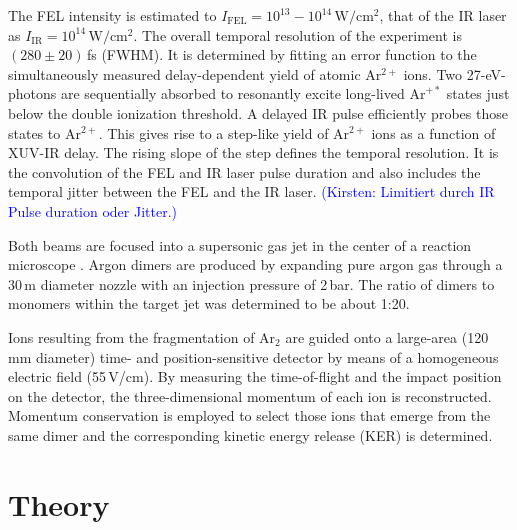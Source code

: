 \documentclass[%
 aip,
rsi,%
 amsmath,amssymb,
preprint,%
]{revtex4-1}
\begin{document}
The FEL intensity is estimated to $I_{\mathrm{FEL}} = 10^{13}-10^{14}\,\mathrm{W}/\mathrm{cm}^2$, that of the IR laser as $I_{\mathrm{IR}} = 10^{14}\,\mathrm{W}/\mathrm{cm}^2$. The overall temporal resolution of the experiment is $(280 \pm 20)$\,fs (FWHM). It is determined by fitting an error function to the simultaneously measured delay-dependent yield of atomic Ar$^{2+}$ ions. Two 27-eV-photons are sequentially absorbed to resonantly excite long-lived $\mathrm{Ar}^{+*}$ states just below the double ionization threshold. A delayed IR pulse efficiently probes those states to Ar$^{2+}$. This gives rise to a step-like yield of Ar$^{2+}$ ions as a function of XUV-IR delay. The rising slope of the step defines the temporal resolution. It is the convolution of the FEL and IR laser pulse duration and also includes the temporal jitter between the FEL and the IR laser. \textcolor{blue}{(Kirsten: Limitiert durch IR Pulse duration oder Jitter.)}

Both beams are focused into a supersonic gas jet in the center of a reaction microscope \cite{Ullrich2003}. Argon dimers are produced by expanding pure argon gas through a 30\,\textmu m diameter nozzle with an injection pressure of 2\,bar. The ratio of dimers to monomers within the target jet was determined to be about 1:20.

Ions resulting from the fragmentation of Ar$_2$ are guided onto a large-area (120\,mm diameter) time- and position-sensitive detector by means of a homogeneous electric field (55\,V/cm). By measuring the time-of-flight and the impact position on the detector, the three-dimensional momentum of each ion is reconstructed. Momentum conservation is employed to select those ions that emerge from the same dimer and the corresponding kinetic energy release (KER) is determined.  


\section{Theory}
 \label{sec:theory}
 
\end{document}
